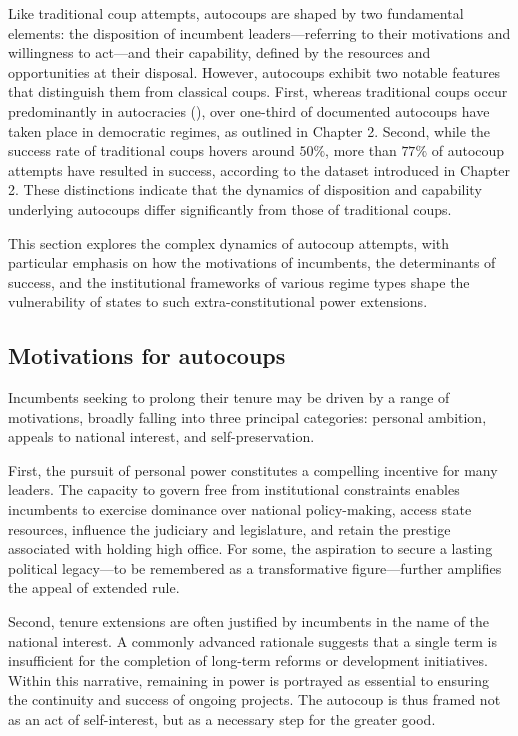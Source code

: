 \documentclass[
  12pt,
]{report}
\begin{document}
Like traditional coup attempts, autocoups are shaped by two fundamental
elements: the disposition of incumbent leaders---referring to their
motivations and willingness to act---and their capability, defined by
the resources and opportunities at their disposal. However, autocoups
exhibit two notable features that distinguish them from classical coups.
First, whereas traditional coups occur predominantly in autocracies
(), over one-third of
documented autocoups have taken place in democratic regimes, as outlined
in Chapter 2. Second, while the success rate of traditional coups hovers
around \(50\%\), more than \(77\%\) of autocoup attempts have resulted
in success, according to the dataset introduced in Chapter 2. These
distinctions indicate that the dynamics of disposition and capability
underlying autocoups differ significantly from those of traditional
coups.

This section explores the complex dynamics of autocoup attempts, with
particular emphasis on how the motivations of incumbents, the
determinants of success, and the institutional frameworks of various
regime types shape the vulnerability of states to such
extra-constitutional power extensions.

\subsection*{Motivations for autocoups}\label{motivations-for-autocoups}

Incumbents seeking to prolong their tenure may be driven by a range of
motivations, broadly falling into three principal categories: personal
ambition, appeals to national interest, and self-preservation.

First, the pursuit of personal power constitutes a compelling incentive
for many leaders. The capacity to govern free from institutional
constraints enables incumbents to exercise dominance over national
policy-making, access state resources, influence the judiciary and
legislature, and retain the prestige associated with holding high
office. For some, the aspiration to secure a lasting political
legacy---to be remembered as a transformative figure---further amplifies
the appeal of extended rule.

Second, tenure extensions are often justified by incumbents in the name
of the national interest. A commonly advanced rationale suggests that a
single term is insufficient for the completion of long-term reforms or
development initiatives. Within this narrative, remaining in power is
portrayed as essential to ensuring the continuity and success of ongoing
projects. The autocoup is thus framed not as an act of self-interest,
but as a necessary step for the greater good.
\end{document}

